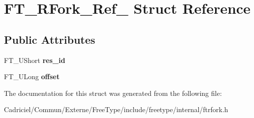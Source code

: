 \hypertarget{struct_f_t___r_fork___ref__}{\section{F\-T\-\_\-\-R\-Fork\-\_\-\-Ref\-\_\- Struct Reference}
\label{struct_f_t___r_fork___ref__}
}
\subsection*{Public Attributes}
\begin{DoxyCompactItemize}
\item 
\hypertarget{struct_f_t___r_fork___ref___a7bca14bddf56df7903166b52e19a0500}{F\-T\-\_\-\-U\-Short {\bfseries res\-\_\-id}}\label{struct_f_t___r_fork___ref___a7bca14bddf56df7903166b52e19a0500}

\item 
\hypertarget{struct_f_t___r_fork___ref___af84c349a29b40c42a788927b113f9ecf}{F\-T\-\_\-\-U\-Long {\bfseries offset}}\label{struct_f_t___r_fork___ref___af84c349a29b40c42a788927b113f9ecf}

\end{DoxyCompactItemize}


The documentation for this struct was generated from the following file\-:\begin{DoxyCompactItemize}
\item 
Cadriciel/\-Commun/\-Externe/\-Free\-Type/include/freetype/internal/ftrfork.\-h\end{DoxyCompactItemize}
